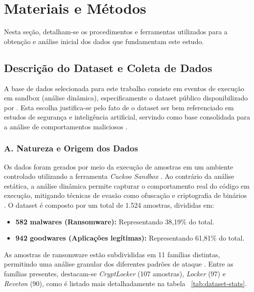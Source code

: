 
\section{Materiais e Métodos} \label{sec:metodo}

Nesta seção, detalham-se os procedimentos e ferramentas utilizados para a obtenção e análise inicial dos dados que fundamentam este estudo.

\subsection{Descrição do Dataset e Coleta de Dados} \label{subsec:dataset}
A base de dados selecionada para este trabalho consiste em eventos de execução em sandbox (análise dinâmica), especificamente o dataset público disponibilizado por \cite{sgandurra2016}. Esta escolha justifica-se pelo fato de o dataset ser bem referenciado em estudos de segurança e inteligência artificial, servindo como base consolidada para a análise de comportamentos maliciosos \cite{caio2022}.

\subsubsection{A. Natureza e Origem dos Dados} \label{subsubsec:dataset-natureza}
Os dados foram gerados por meio da execução de amostras em um ambiente controlado utilizando a ferramenta \textit{Cuckoo Sandbox} \cite{cuckoosandbox}. Ao contrário da análise estática, a análise dinâmica permite capturar o comportamento real do código em execução, mitigando técnicas de evasão como ofuscação e criptografia de binários \cite{sgandurra2016}. O dataset é composto por um total de 1.524 amostras, divididas em:
\begin{itemize}
    \item \textbf{582 malwares (Ransomware):} Representando 38,19\% do total.
    \item \textbf{942 goodwares (Aplicações legítimas):} Representando 61,81\% do total.
\end{itemize}

As amostras de ransomware estão subdivididas em 11 famílias distintas, permitindo uma análise granular dos diferentes padrões de ataque \cite{sgandurra2016}. Entre as famílias presentes, destacam-se \textit{CryptLocker} (107 amostras), \textit{Locker} (97) e \textit{Reveton} (90), como é listado mais detalhadamente na tabela ~\ref{tab:dataset-stats}.

